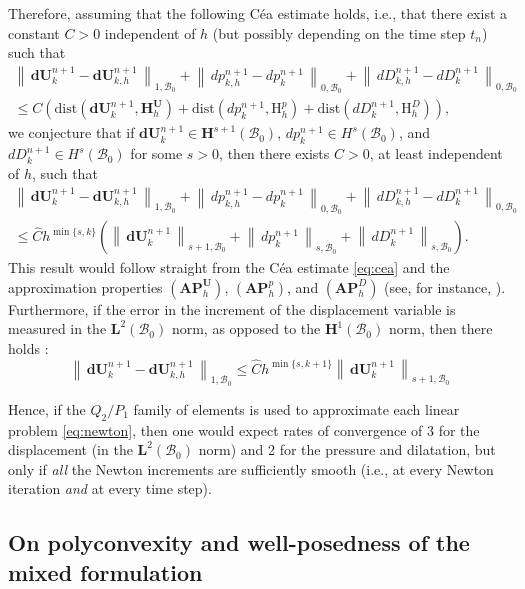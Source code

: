\documentclass{sfuthesis}
\numberwithin{equation}{section}
\numberwithin{figure}{chapter}
\numberwithin{table}{chapter}
\theoremstyle{definition}
\def\*#1{{\mathbf{#1}}} %
\newcommand{\B}{\mathcal{B}}
\newcommand{\Hhu}{\mathbf{H}_h^{\*U}}
\newcommand{\Hhp}{\mathrm{H}_h^{p}}
\newcommand{\HhD}{\mathrm{H}_h^{D}}
\newcommand{\norm}[1]{{\left\| \, #1 \, \right\|}}
\begin{document}
Therefore, assuming that the following C\'{e}a estimate holds, i.e., that there exist a constant $C>0$ independent of $h$ (but possibly depending on the time step $t_n$) such that
\begin{multline} \label{eq:cea}
    \norm{\*d\*U_{k}^{n+1} - \*d\*U_{k,h}^{n+1}}_{1,\B_0} + \norm{dp_{k,h}^{n+1} - dp_k^{n+1}}_{0,\B_0} + \norm{dD_{k,h}^{n+1} - dD_k^{n+1}}_{0,\B_0} \\
    \leq C \left( \mathrm{dist}(\*d\*U_k^{n+1},\Hhu) + \mathrm{dist}(dp_k^{n+1},\Hhp) +  \mathrm{dist}(dD_k^{n+1},\HhD)\right),
\end{multline}
we conjecture that if $\*d\*U_k^{n+1} \in \*H^{s+1}(\B_0)$, $dp_k^{n+1} \in H^s(\B_0)$, and $dD_k^{n+1} \in H^s(\B_0)$ for some $s>0$, then there exists $\widehat{C}>0$, at least independent of $h$, such that
\begin{multline} \label{eq:a_priori_linear_problem}
    \norm{\*d\*U_{k}^{n+1} - \*d\*U_{k,h}^{n+1}}_{1,\B_0} + \norm{dp_{k,h}^{n+1} - dp_k^{n+1}}_{0,\B_0} + \norm{dD_{k,h}^{n+1} - dD_k^{n+1}}_{0,\B_0} \\
    \leq \widehat{C} h^{\min\{s,k\}} \left( \norm{\*d\*U_k^{n+1}}_{s+1,\B_0} + \norm{dp_k^{n+1}}_{s,\B_0} + \norm{dD_k^{n+1}}_{s,\B_0} \right).
\end{multline}
This result would follow straight from the C\'{e}a estimate \eqref{eq:cea} and the approximation properties $(\mathbf{AP}_h^\*U)$, $(\mathbf{AP}_h^p)$, and $(\mathbf{AP}_h^D)$ (see, for instance, \cite{AlmonacidGatica2018}). Furthermore, if the error in the increment of the displacement variable is measured in the $\*L^2(\B_0)$ norm, as opposed to the $\*H^1(\B_0)$ norm, then there holds \cite{BoffiBrezziFortin2013}:
\begin{equation}
    \norm{\*d\*U_{k}^{n+1} - \*d\*U_{k,h}^{n+1}}_{1,\B_0} \leq \widehat{C}  h^{\min\{s,k+1\}}  \norm{\*d\*U_k^{n+1}}_{s+1,\B_0}
\end{equation}

Hence, if the $Q_2/P_1$ family of elements is used to approximate each linear problem \eqref{eq:newton}, then one would expect rates of convergence of 3 for the displacement (in the $\*L^2(\B_0)$ norm) and 2 for the pressure and dilatation, but only if \textit{all} the Newton increments are sufficiently smooth (i.e., at every Newton iteration \textit{and} at every time step).

\subsection{On polyconvexity and well-posedness of the mixed formulation} \label{sec:polyconvexity}
\end{document}
